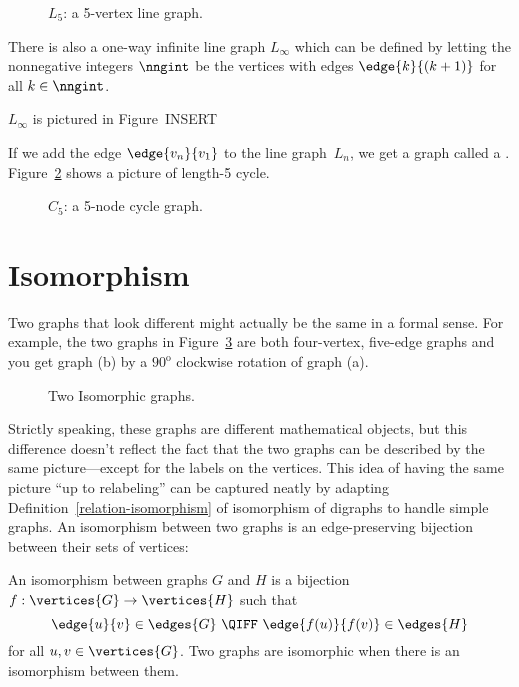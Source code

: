 \begin{figure}
\caption{$L_5$: a 5-vertex line graph.}
\label{fig:graph_L_5}
\end{figure}

There is also a one-way infinite line graph $L_{\infty}$ which can be
defined by letting the nonnegative integers $\nngint$ be the vertices
with edges $\edge{k}{(k+1)}$ for all $k \in \nngint$.
\begin{editingnotes}
$L_{\infty}$ is pictured in Figure~INSERT%
\end{editingnotes}

If we add the edge $\edge{v_n}{v_1}$ to the line graph~$L_n$, we get a
graph called a  .
Figure~\ref{fig:graph_C_5} shows a picture of length-5 cycle.

\begin{figure}
\caption{$C_5$: a 5-node cycle graph.}
\label{fig:graph_C_5}
\end{figure}

\section{Isomorphism}\label{isomorphism_sec}
Two graphs that look different might actually be the same in a formal
sense.  For example, the two graphs in
Figure~\ref{fig:isomorphic-C4cross} are both four-vertex, five-edge graphs
and you get graph (b) by a $90^{\text{o}}$ clockwise rotation of graph
(a).
\begin{figure}
\qquad
{}
\caption{Two Isomorphic graphs.}
\label{fig:isomorphic-C4cross}
\end{figure}

Strictly speaking, these graphs are different mathematical objects,
but this difference doesn't reflect the fact that the two graphs can
be described by the same picture---except for the labels on the
vertices.  This idea of having the same picture ``up to relabeling''
can be captured neatly by adapting
Definition~\ref{relation-isomorphism} of isomorphism of digraphs to
handle simple graphs.  An isomorphism between two graphs is an
edge-preserving bijection between their sets of vertices:

\begin{definition}\label{simple-isomorphism}
An isomorphism between graphs $G$ and $H$ is a bijection
$f:\vertices{G} \to \vertices{H}$ such that
\[
\edge{u}{v} \in \edges{G}\ \QIFF\ \edge{f(u)}{f(v)} \in \edges{H}
\]
for all $u, v \in \vertices{G}$.  Two graphs are isomorphic when there
is an isomorphism between them.
\end{definition}

